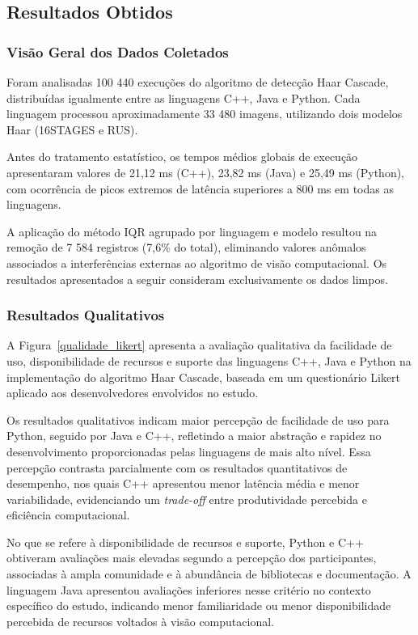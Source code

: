 \subsection{Resultados Obtidos}

\subsubsection{Visão Geral dos Dados Coletados}

Foram analisadas 100 440 execuções do algoritmo de detecção Haar Cascade, distribuídas igualmente entre as linguagens C++, Java e Python. Cada linguagem processou aproximadamente 33 480 imagens, utilizando dois modelos Haar (16STAGES e RUS).

Antes do tratamento estatístico, os tempos médios globais de execução apresentaram valores de 21,12 ms (C++), 23,82 ms (Java) e 25,49 ms (Python), com ocorrência de picos extremos de latência superiores a 800 ms em todas as linguagens.

A aplicação do método IQR agrupado por linguagem e modelo resultou na remoção de 7 584 registros (7,6\% do total), eliminando valores anômalos associados a interferências externas ao algoritmo de visão computacional. Os resultados apresentados a seguir consideram exclusivamente os dados limpos.


\subsubsection{Resultados Qualitativos}
A Figura~\ref{qualidade_likert} apresenta a avaliação qualitativa da facilidade de uso, disponibilidade de recursos e suporte das linguagens C++, Java e Python na implementação do algoritmo Haar Cascade, baseada em um questionário Likert aplicado aos desenvolvedores envolvidos no estudo.

Os resultados qualitativos indicam maior percepção de facilidade de uso para Python, seguido por Java e C++, refletindo a maior abstração e rapidez no desenvolvimento proporcionadas pelas linguagens de mais alto nível. Essa percepção contrasta parcialmente com os resultados quantitativos de desempenho, nos quais C++ apresentou menor latência média e menor variabilidade, evidenciando um \textit{trade-off} entre produtividade percebida e eficiência computacional.

No que se refere à disponibilidade de recursos e suporte, Python e C++ obtiveram avaliações mais elevadas segundo a percepção dos participantes, associadas à ampla comunidade e à abundância de bibliotecas e documentação. A linguagem Java apresentou avaliações inferiores nesse critério no contexto específico do estudo, indicando menor familiaridade ou menor disponibilidade percebida de recursos voltados à visão computacional.

